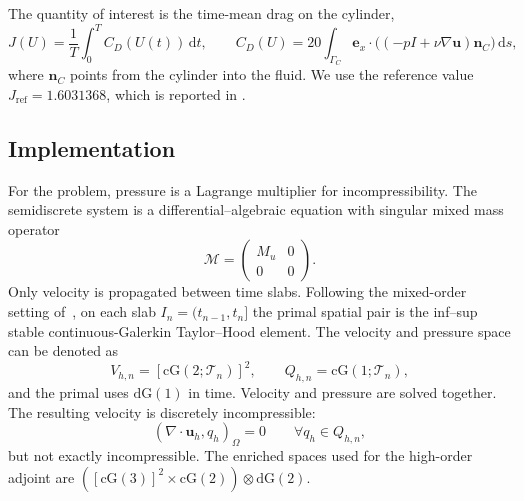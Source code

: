 The quantity of interest is the time-mean drag on the cylinder,
\begin{equation}
 J(U)=\frac1T\int_0^T C_D(U(t))\,\mathrm dt,
 \qquad
 C_D(U)=20\int_{\Gamma_C}
 \boldsymbol e_x\!\cdot\!\bigl((-pI+\nu\nabla\boldsymbol u)
 \boldsymbol n_C\bigr)\,\mathrm ds,
 \label{eq:cylinder-goal}
\end{equation}
where \(\boldsymbol n_C\) points from the cylinder into the fluid. We use the reference value \(J_{\mathrm{ref}}=1.6031368\), which is reported in \cite{non-flow}.


\subsection{Implementation}
\label{subsec:cylinder-mixed-treatment}

For the problem, pressure is a Lagrange multiplier for incompressibility. The semidiscrete system is a differential--algebraic equation with singular mixed mass operator
\begin{equation}
 \mathcal M=
 \begin{pmatrix}M_u&0\\0&0\end{pmatrix}.
\end{equation}
Only velocity is propagated between time slabs.
Following the mixed-order setting of~\cite{non-flow}, on each slab \(I_n=(t_{n-1},t_n]\) the primal spatial pair is the inf--sup stable continuous-Galerkin Taylor--Hood element. The velocity and pressure space can be denoted as 
\begin{equation}
 V_{h,n}=[\mathrm{cG}(2;\mathcal T_n)]^2,
 \qquad Q_{h,n}=\mathrm{cG}(1;\mathcal T_n),
 \label{eq:cylinder-taylor-hood}
\end{equation}
and the primal uses \(\mathrm{dG}(1)\) in time. Velocity and pressure are solved together. The resulting velocity is discretely incompressible:
\begin{equation}
 (\nabla\!\cdot\boldsymbol u_h,q_h)_\Omega=0
 \qquad\forall q_h\in Q_{h,n},
 \label{eq:cylinder-discrete-divergence}
\end{equation}
but not exactly incompressible.
The enriched spaces used for the high-order adjoint are \(([\mathrm{cG}(3)]^2 \times \mathrm{cG}(2)) \otimes \mathrm{dG}(2)\).

